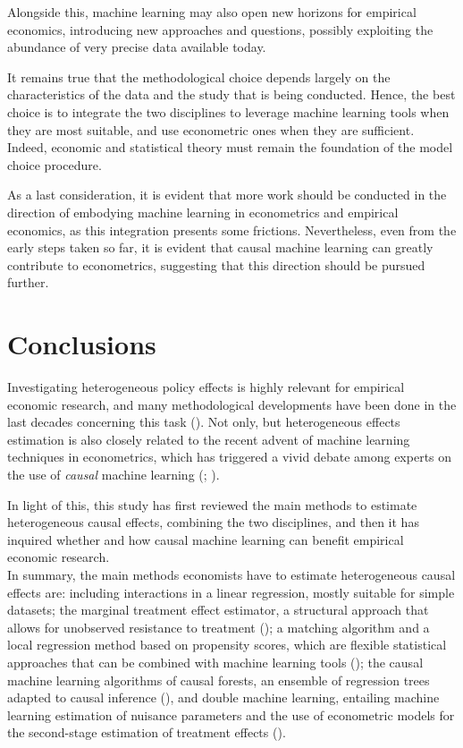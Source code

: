 \documentclass[12pt,a4paper,openright,twoside]{book}
\begin{document}
\begin{doublespacing}
Alongside this, machine learning may also open new horizons for empirical economics, introducing new approaches and questions, possibly exploiting the abundance of very precise data available today.


It remains true that the methodological choice depends largely on the characteristics of the data and the study that is being conducted. Hence, the best choice is to integrate the two disciplines to leverage machine learning tools when they are most suitable, and use econometric ones when they are sufficient. Indeed, economic and statistical theory must remain the foundation of the model choice procedure. 

  
As a last consideration, it is evident that more work should be conducted in the direction of embodying machine learning in econometrics and empirical economics, as this integration presents some frictions. Nevertheless, even from the early steps taken so far, it is evident that causal machine learning can greatly contribute to econometrics, suggesting that this direction should be pursued further. 




\chapter*{Conclusions}
\markboth{}{}

Investigating heterogeneous policy effects is highly relevant for empirical economic research, and many methodological developments have been done in the last decades concerning this task (\citealp{zhouxie2020heterogeneous}). Not only, but heterogeneous effects estimation is also closely related to the recent advent of machine learning techniques in econometrics, which has triggered a vivid debate among experts on the use of \textit{causal} machine learning (\citealp{athey2019}; \citealp{videoimbangr}). 

In light of this, this study has first reviewed the main methods to estimate heterogeneous causal effects, combining the two disciplines, and then it has inquired whether and how causal machine learning can benefit empirical economic research. \\

In summary, the main methods economists have to estimate heterogeneous causal effects are: including interactions in a linear regression, mostly suitable for simple datasets; the marginal treatment effect estimator, a structural approach that allows for unobserved resistance to treatment (\citealp{heckman2005structural}); a matching algorithm and a local regression method based on propensity scores, which are flexible statistical approaches that can be combined with machine learning tools (\citealp{xie2012estimating}); the causal machine learning algorithms of causal forests, an ensemble of regression trees adapted to causal inference (\citealp{wagerathey2018}), and double machine learning, entailing machine learning estimation of nuisance parameters and the use of econometric models for the second-stage estimation of treatment effects (\citealp{chernozhukov2018double}).


\end{doublespacing}
\end{document}
